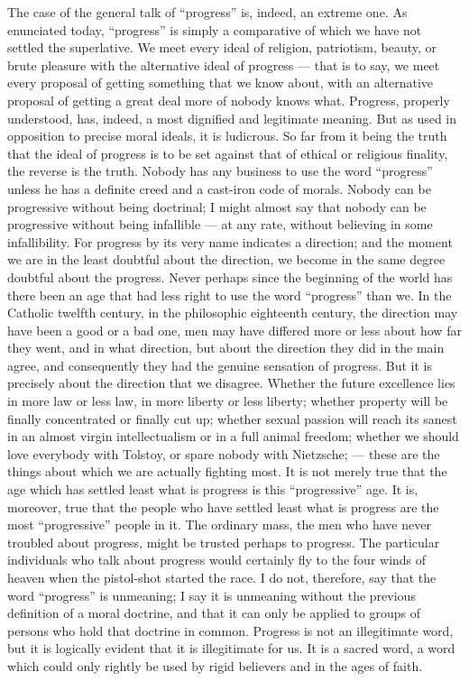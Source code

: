 The case of the general talk of “progress” is, indeed, an extreme one. As enunciated today, “progress” is simply a comparative of which we have not settled the superlative. We meet every ideal of religion, patriotism, beauty, or brute pleasure with the alternative ideal of progress — that is to say, we meet every proposal of getting something that we know about, with an alternative proposal of getting a great deal more of nobody knows what. Progress, properly understood, has, indeed, a most dignified and legitimate meaning. But as used in opposition to precise moral ideals, it is ludicrous. So far from it being the truth that the ideal of progress is to be set against that of ethical or religious finality, the reverse is the truth. Nobody has any business to use the word “progress” unless he has a definite creed and a cast-iron code of morals. Nobody can be progressive without being doctrinal; I might almost say that nobody can be progressive without being infallible — at any rate, without believing in some infallibility. For progress by its very name indicates a direction; and the moment we are in the least doubtful about the direction, we become in the same degree doubtful about the progress. Never perhaps since the beginning of the world has there been an age that had less right to use the word “progress” than we. In the Catholic twelfth century, in the philosophic eighteenth century, the direction may have been a good or a bad one, men may have differed more or less about how far they went, and in what direction, but about the direction they did in the main agree, and consequently they had the genuine sensation of progress. But it is precisely about the direction that we disagree. Whether the future excellence lies in more law or less law, in more liberty or less liberty; whether property will be finally concentrated or finally cut up; whether sexual passion will reach its sanest in an almost virgin intellectualism or in a full animal freedom; whether we should love everybody with Tolstoy, or spare nobody with Nietzsche; — these are the things about which we are actually fighting most. It is not merely true that the age which has settled least what is progress is this “progressive” age. It is, moreover, true that the people who have settled least what is progress are the most “progressive” people in it. The ordinary mass, the men who have never troubled about progress, might be trusted perhaps to progress. The particular individuals who talk about progress would certainly fly to the four winds of heaven when the pistol-shot started the race. I do not, therefore, say that the word “progress” is unmeaning; I say it is unmeaning without the previous definition of a moral doctrine, and that it can only be applied to groups of persons who hold that doctrine in common. Progress is not an illegitimate word, but it is logically evident that it is illegitimate for us. It is a sacred word, a word which could only rightly be used by rigid believers and in the ages of faith.

